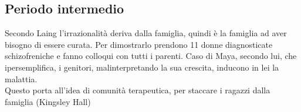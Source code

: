 \documentclass[12pt, a4paper]{article}
\begin{document}
\subsection{Periodo intermedio}

Secondo Laing l'irrazionalità deriva dalla famiglia, quindi è la famiglia ad aver bisogno di essere curata. 
Per dimostrarlo prendono 11 donne diagnosticate schizofreniche e fanno colloqui con tutti i parenti.
Caso di Maya, secondo lui, che ipersemplifica, i genitori, malinterpretando la sua crescita, inducono in lei la malattia.
\medskip\\ 
Questo porta all'idea di comunità terapeutica, per staccare i ragazzi dalla famiglia (Kingsley Hall)
\end{document}
